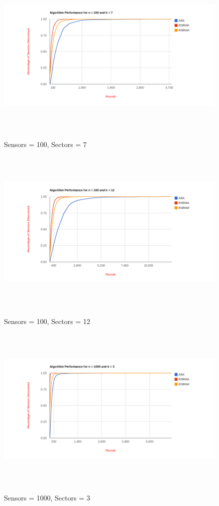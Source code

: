 \begin{figure}[ht]
\caption{Sensors = 100, Sectors = 7}
\includegraphics[height = 8cm]{pics/graph100k7.png}\\[0.5cm]   
\label{fig:n10k7} 
\end{figure}

\begin{figure}[ht]
\caption{Sensors = 100, Sectors = 12}
\includegraphics[height = 8cm]{pics/graph100k12.png}\\[0.5cm] 
\label{fig:n10k12}   
\end{figure}


\begin{figure}[ht]
\caption{Sensors = 1000, Sectors = 3}
\includegraphics[height = 8cm]{pics/graph1000k3.png}\\[0.5cm]    
\label{fig:n10k3}
\end{figure}

